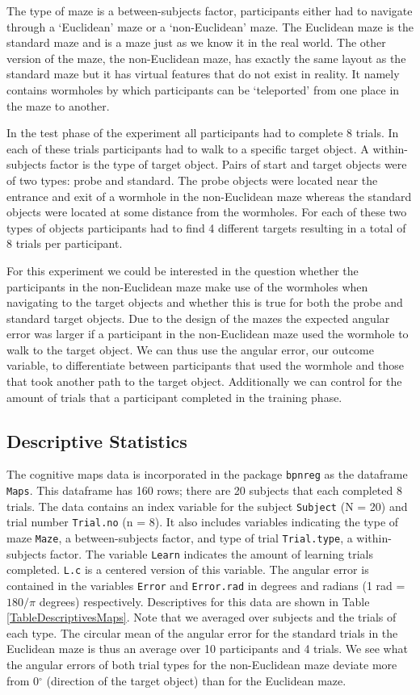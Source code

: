 \documentclass[11pt,]{article}
\begin{document}
The type of maze is a between-subjects factor, participants either had
to navigate through a `Euclidean' maze or a `non-Euclidean' maze. The
Euclidean maze is the standard maze and is a maze just as we know it in
the real world. The other version of the maze, the non-Euclidean maze,
has exactly the same layout as the standard maze but it has virtual
features that do not exist in reality. It namely contains wormholes by
which participants can be `teleported' from one place in the maze to
another.

In the test phase of the experiment all participants had to complete 8
trials. In each of these trials participants had to walk to a specific
target object. A within-subjects factor is the type of target object.
Pairs of start and target objects were of two types: probe and standard.
The probe objects were located near the entrance and exit of a wormhole
in the non-Euclidean maze whereas the standard objects were located at
some distance from the wormholes. For each of these two types of objects
participants had to find 4 different targets resulting in a total of 8
trials per participant.

For this experiment we could be interested in the question whether the
participants in the non-Euclidean maze make use of the wormholes when
navigating to the target objects and whether this is true for both the
probe and standard target objects. Due to the design of the mazes the
expected angular error was larger if a participant in the non-Euclidean
maze used the wormhole to walk to the target object. We can thus use the
angular error, our outcome variable, to differentiate between
participants that used the wormhole and those that took another path to
the target object. Additionally we can control for the amount of trials
that a participant completed in the training phase.

\subsection{Descriptive Statistics}\label{DescriptiveMaps}

The cognitive maps data is incorporated in the package \verb|bpnreg| as
the dataframe \verb|Maps|. This dataframe has 160 rows; there are 20
subjects that each completed 8 trials. The data contains an index
variable for the subject \verb|Subject| (N = 20) and trial number
\verb|Trial.no| (n = 8). It also includes variables indicating the type
of maze \verb|Maze|, a between-subjects factor, and type of trial
\verb|Trial.type|, a within-subjects factor. The variable \verb|Learn|
indicates the amount of learning trials completed. \verb|L.c| is a
centered version of this variable. The angular error is contained in the
variables \verb|Error| and \verb|Error.rad| in degrees and radians (1
rad = \(180/\pi\) degrees) respectively. Descriptives for this data are
shown in Table \ref{TableDescriptivesMaps}. Note that we averaged over
subjects and the trials of each type. The circular mean of the angular
error for the standard trials in the Euclidean maze is thus an average
over 10 participants and 4 trials. We see what the angular errors of
both trial types for the non-Euclidean maze deviate more from
0\(^{\circ}\) (direction of the target object) than for the Euclidean
maze.
\end{document}
